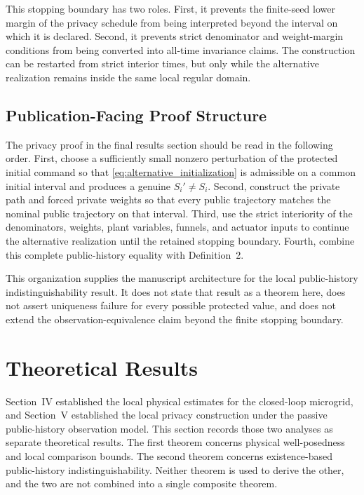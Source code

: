 \documentclass[journal]{IEEEtran}
\begin{document}
This stopping boundary has two roles. First, it prevents the finite-seed lower
margin of the privacy schedule from being interpreted beyond the interval on
which it is declared. Second, it prevents strict denominator and weight-margin
conditions from being converted into all-time invariance claims. The
construction can be restarted from strict interior times, but only while the
alternative realization remains inside the same local regular domain.

\subsection{Publication-Facing Proof Structure}

The privacy proof in the final results section should be read in the following
order. First, choose a sufficiently small nonzero perturbation of the protected
initial command so that \eqref{eq:alternative_initialization} is admissible on a
common initial interval and produces a genuine $S_i'\neq S_i$. Second, construct
the private path and forced private weights so that every public trajectory
matches the nominal public trajectory on that interval. Third, use the strict
interiority of the denominators, weights, plant variables, funnels, and actuator
inputs to continue the alternative realization until the retained stopping
boundary. Fourth, combine this complete public-history equality with
Definition~2.

This organization supplies the manuscript architecture for the local
public-history indistinguishability result. It does not state that result as a
theorem here, does not assert uniqueness failure for every possible protected
value, and does not extend the observation-equivalence claim beyond the finite
stopping boundary.

\section{Theoretical Results}
\label{sec:theoretical_results}

Section~IV established the local physical estimates for the closed-loop
microgrid, and Section~V established the local privacy construction under the
passive public-history observation model. This section records those two
analyses as separate theoretical results. The first theorem concerns physical
well-posedness and local comparison bounds. The second theorem concerns
existence-based public-history indistinguishability. Neither theorem is used to
derive the other, and the two are not combined into a single composite theorem.
\end{document}
